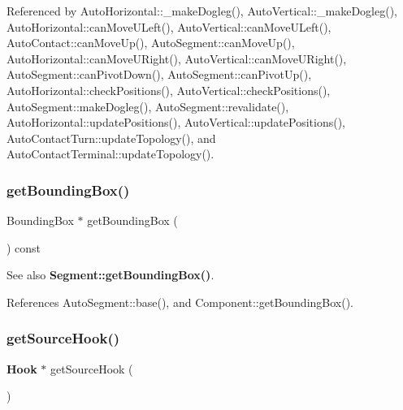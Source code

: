 Referenced by Auto\+Horizontal\+::\+\_\+make\+Dogleg(), Auto\+Vertical\+::\+\_\+make\+Dogleg(), Auto\+Horizontal\+::can\+Move\+U\+Left(), Auto\+Vertical\+::can\+Move\+U\+Left(), Auto\+Contact\+::can\+Move\+Up(), Auto\+Segment\+::can\+Move\+Up(), Auto\+Horizontal\+::can\+Move\+U\+Right(), Auto\+Vertical\+::can\+Move\+U\+Right(), Auto\+Segment\+::can\+Pivot\+Down(), Auto\+Segment\+::can\+Pivot\+Up(), Auto\+Horizontal\+::check\+Positions(), Auto\+Vertical\+::check\+Positions(), Auto\+Segment\+::make\+Dogleg(), Auto\+Segment\+::revalidate(), Auto\+Horizontal\+::update\+Positions(), Auto\+Vertical\+::update\+Positions(), Auto\+Contact\+Turn\+::update\+Topology(), and Auto\+Contact\+Terminal\+::update\+Topology().

\mbox{\label{classKatabatic_1_1AutoSegment_a63a3ab1e6501bbad68b9efd4998e48c0}} 
\subsubsection{\texorpdfstring{get\+Bounding\+Box()}{getBoundingBox()}}
{\footnotesize\ttfamily Bounding\+Box $\ast$ get\+Bounding\+Box (\begin{DoxyParamCaption}{ }\end{DoxyParamCaption}) const\hspace{0.3cm}{\ttfamily [inline]}}

\begin{DoxySeeAlso}{See also}
\textbf{ Segment\+::get\+Bounding\+Box()}. 
\end{DoxySeeAlso}


References Auto\+Segment\+::base(), and Component\+::get\+Bounding\+Box().

\mbox{\label{classKatabatic_1_1AutoSegment_a1defbbaef0a1975993e157a8d5f68ded}} 
\subsubsection{\texorpdfstring{get\+Source\+Hook()}{getSourceHook()}}
{\footnotesize\ttfamily \textbf{ Hook} $\ast$ get\+Source\+Hook (\begin{DoxyParamCaption}{ }\end{DoxyParamCaption})\hspace{0.3cm}{\ttfamily [inline]}}

